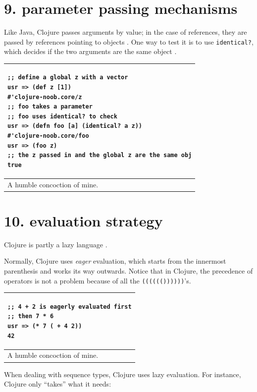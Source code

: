 \documentclass[12pt]{article}
\begin{document}
\part{9. parameter passing mechanisms}

Like Java, Clojure passes arguments by value; in the case of references, they are passed by references pointing to objects \cite{pass}. One way to test it is to use \texttt{identical?}, which decides if the two arguments are the same object \cite{empty}.


\begin{tabular}{|p{}|}
\hline
\begin{verbatim}
;; define a global z with a vector
usr => (def z [1])
#'clojure-noob.core/z
;; foo takes a parameter 
;; foo uses identical? to check
usr => (defn foo [a] (identical? a z))
#'clojure-noob.core/foo
usr => (foo z)
;; the z passed in and the global z are the same obj
true    
\end{verbatim}
\\
\hline
A humble concoction of mine.
\\
\hline
\end{tabular}

\newpage










\part{10. evaluation strategy}

Clojure is partly a lazy language \cite{fogus2014joy}.

Normally, Clojure uses {\it eager} evaluation, which starts from the innermost parenthesis and works its way outwards. Notice that in Clojure, the precedence of operators is not a problem because of all the \texttt{(((((())))))}'s.


\begin{tabular}{|p{}|}
\hline
\begin{verbatim}
;; 4 + 2 is eagerly evaluated first
;; then 7 * 6
usr => (* 7 ( + 4 2))
42
\end{verbatim}
\\
\hline
A humble concoction of mine.
\\
\hline
\end{tabular}

When dealing with sequence types, Clojure uses lazy evaluation. For instance, Clojure only ``takes'' what it needs:
\end{document}

